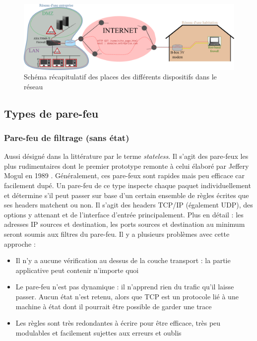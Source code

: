 \documentclass[]{article}
\begin{document}
\begin{figure}[!h]
\centering
\includegraphics[scale=1.65]{netw_IDS.png}
\caption{Schéma récapitulatif des places des différents dispositifs dans le réseau}
\label{netw_IDS}
\end{figure}

\subsection{Types de pare-feu}

\subsubsection{Pare-feu de filtrage (sans état)}

Aussi désigné dans la littérature par le terme \textit{stateless}. Il s'agit des pare-feux les plus rudimentaires dont le premier prototype remonte à celui élaboré par Jeffery Mogul en 1989 \cite{Shieha2014}. Généralement, ces pare-feux sont rapides mais peu efficace car facilement dupé. Un pare-feu de ce type inspecte chaque paquet individuellement et détermine s'il peut passer sur base d'un certain ensemble de règles écrites que ses headers matchent ou non. Il s'agit des headers TCP/IP (également UDP), des options y attenant et de l'interface d'entrée principalement. Plus en détail : les adresses IP sources et destination, les ports sources et destination au minimum seront soumis aux filtres du pare-feu. Il y a plusieurs problèmes avec cette approche :
\vspace{0.25cm}
\begin{itemize}
\item Il n'y a aucune vérification au dessus de la couche transport : la partie applicative peut contenir n'importe quoi
\item Le pare-feu n'est pas dynamique : il n'apprend rien du trafic qu'il laisse passer. Aucun état n'est retenu, alors que TCP est un protocole lié à une machine à état dont il pourrait être possible de garder une trace
\item Les règles sont très redondantes à écrire pour être efficace, très peu modulables et facilement sujettes aux erreurs et oublis
\end{itemize}
\vspace{0.25cm}
\end{document}
